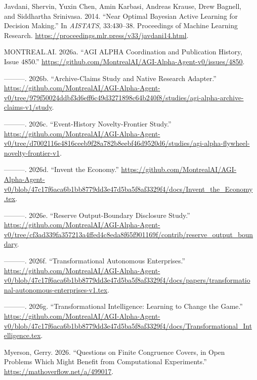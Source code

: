 \documentclass[11pt,a4paper]{article}
\newenvironment{CSLReferences}[2]{\begingroup\small\raggedright\setlength{\parskip}{0.5em}\setlength{\parindent}{0pt}}{\endgroup}
\begin{document}
\begin{CSLReferences}{1}{0}
\leavevmode{}%
Javdani, Shervin, Yuxin Chen, Amin Karbasi, Andreas Krause, Drew
Bagnell, and Siddhartha Srinivasa. 2014. {``Near Optimal Bayesian Active
Learning for Decision Making.''} In \emph{AISTATS}, 33:430--38.
Proceedings of Machine Learning Research.
\url{https://proceedings.mlr.press/v33/javdani14.html}.

\leavevmode{}%
MONTREAL.AI. 2026a. {``AGI ALPHA Coordination and Publication History,
Issue 4850.''}
\url{https://github.com/MontrealAI/AGI-Alpha-Agent-v0/issues/4850}.

\leavevmode{}%
---------. 2026b. {``Archive-Claims Study and Native Research
Adapter.''}
\url{https://github.com/MontrealAI/AGI-Alpha-Agent-v0/tree/979f50024ddbf3d6eff6c49d3271898c64b240f8/studies/agi-alpha-archive-claims-v1/study}.

\leavevmode{}%
---------. 2026c. {``Event-History Novelty-Frontier Study.''}
\url{https://github.com/MontrealAI/AGI-Alpha-Agent-v0/tree/d7002116e4816ceeb9f28a782b8eebf46d9520d6/studies/agi-alpha-flywheel-novelty-frontier-v1}.

\leavevmode{}%
---------. 2026d. {``Invent the Economy.''}
\url{https://github.com/MontrealAI/AGI-Alpha-Agent-v0/blob/47c17f6aca6b1bb8779dd3e47d5ba5f8af3329f4/docs/Invent_the_Economy.tex}.

\leavevmode{}%
---------. 2026e. {``Reserve Output-Boundary Disclosure Study.''}
\url{https://github.com/MontrealAI/AGI-Alpha-Agent-v0/tree/cf3ad339fa357213a4ffed4c8eda8f65f901169f/contrib/reserve_output_boundary}.

\leavevmode{}%
---------. 2026f. {``Transformational Autonomous Enterprises.''}
\url{https://github.com/MontrealAI/AGI-Alpha-Agent-v0/blob/47c17f6aca6b1bb8779dd3e47d5ba5f8af3329f4/docs/papers/transformational-autonomous-enterprises-v1.tex}.

\leavevmode{}%
---------. 2026g. {``Transformational Intelligence: Learning to Change
the Game.''}
\url{https://github.com/MontrealAI/AGI-Alpha-Agent-v0/blob/47c17f6aca6b1bb8779dd3e47d5ba5f8af3329f4/docs/Transformational_Intelligence.tex}.

\leavevmode{}%
Myerson, Gerry. 2026. {``Questions on Finite Congruence Covers, in Open
Problems Which Might Benefit from Computational Experiments.''}
\url{https://mathoverflow.net/a/499017}.


\end{CSLReferences}
\end{document}
